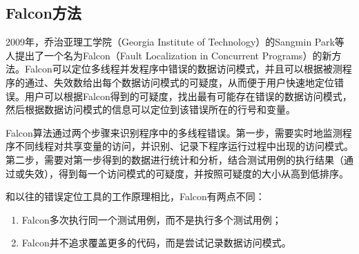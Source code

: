 \subsection{Falcon方法}
2009年，乔治亚理工学院（Georgia Institute of Technology）的Sangmin Park等人提出了一个名为Falcon（Fault Localization in Concurrent Programs）的新方法。Falcon可以定位多线程并发程序中错误的数据访问模式，并且可以根据被测程序的通过、失效数给出每个数据访问模式的可疑度，从而便于用户快速地定位错误\cite{park2010falcon}。用户可以根据Falcon得到的可疑度，找出最有可能存在错误的数据访问模式，然后根据数据访问模式的信息可以定位到该错误所在的行号和变量。\par
Falcon算法通过两个步骤来识别程序中的多线程错误。第一步，需要实时地监测程序不同线程对共享变量的访问，并识别、记录下程序运行过程中出现的访问模式。第二步，需要对第一步得到的数据进行统计和分析，结合测试用例的执行结果（通过或失效），得到每一个访问模式的可疑度，并按照可疑度的大小从高到低排序。\par
和以往的错误定位工具的工作原理相比，Falcon有两点不同：
\begin{enumerate}
  \item Falcon多次执行同一个测试用例，而不是执行多个测试用例；
  \item Falcon并不追求覆盖更多的代码，而是尝试记录数据访问模式。
\end{enumerate}
